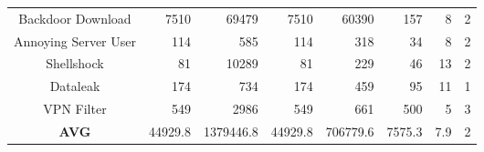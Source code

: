 \begin{table*}[!htb]
{\begin{tabular}{crrrrrrr}
Backdoor Download    & 7510                                                 & 69479                                                & 7510                                         & 60390                                        & 157                                       & 8                                          & 2                                             \\ 
Annoying Server User & 114                                                  & 585                                                  & 114                                          & 318                                          & 34                                        & 8                                          & 2                                             \\ 
Shellshock           & 81                                                   & 10289                                                & 81                                           & 229                                          & 46                                        & 13                                         & 2                                             \\ 
Dataleak             & 174                                                  & 734                                                  & 174                                          & 459                                          & 95                                        & 11                                         & 1                                             \\ 
VPN Filter           & 549                                                  & 2986                                                 & 549                                          & 661                                          & 500                                       & 5                                          & 3                                             \\ 
\textbf{AVG}         & 44929.8                                              & 1379446.8                                            & 44929.8                                      & 706779.6                                     & 7575.3                                    & 7.9                                        & 2                                             \\ \hline
\end{tabular}
}
\end{table*}